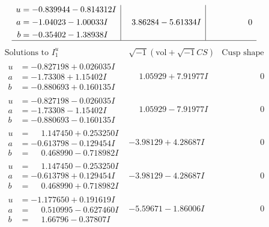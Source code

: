 \documentclass[1p]{elsarticle_modified}
\theoremstyle{definition}
\newcommand{\I}{\sqrt{-1}}
\begin{document}
$$\begin{array}{c|c|c}
\begin{aligned}
u &= -0.839944 - 0.814312 I \\
a &= -1.04023 - 1.00033 I \\
b &= -0.35402 - 1.38938 I\end{aligned}
 & \phantom{-}3.86284 - 5.61334 I & \phantom{-0.000000 } 0\\
 \hline 
 \end{array}$$\newpage$$\begin{array}{c|c|c}  
\text{Solutions to }I^u_{1}& \I (\text{vol} + \sqrt{-1}CS) & \text{Cusp shape}\\
 \hline 
\begin{aligned}
u &= -0.827198 + 0.026035 I \\
a &= -1.73308 + 1.15402 I \\
b &= -0.880693 + 0.160135 I\end{aligned}
 & \phantom{-}1.05929 + 7.91977 I & \phantom{-0.000000 } 0 \\ \hline\begin{aligned}
u &= -0.827198 - 0.026035 I \\
a &= -1.73308 - 1.15402 I \\
b &= -0.880693 - 0.160135 I\end{aligned}
 & \phantom{-}1.05929 - 7.91977 I & \phantom{-0.000000 } 0 \\ \hline\begin{aligned}
u &= \phantom{-}1.147450 + 0.253250 I \\
a &= -0.613798 - 0.129454 I \\
b &= \phantom{-}0.468990 - 0.718982 I\end{aligned}
 & -3.98129 + 4.28687 I & \phantom{-0.000000 } 0 \\ \hline\begin{aligned}
u &= \phantom{-}1.147450 - 0.253250 I \\
a &= -0.613798 + 0.129454 I \\
b &= \phantom{-}0.468990 + 0.718982 I\end{aligned}
 & -3.98129 - 4.28687 I & \phantom{-0.000000 } 0 \\ \hline\begin{aligned}
u &= -1.177650 + 0.191619 I \\
a &= \phantom{-}0.510995 - 0.627460 I \\
b &= \phantom{-}1.66796 - 0.37807 I\end{aligned}
 & -5.59671 - 1.86006 I & \phantom{-0.000000 } 0 \\ \hline\begin{aligned}

\end{aligned}
\end{array}$$
\end{document}
